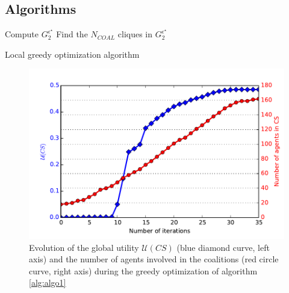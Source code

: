 \documentclass[journal]{IEEEtran}
\begin{document}
\pagestyle{plain}







\appendix
  
\subsection{Algorithms}


\begin{algorithm}
 Compute $ G_{2}^{\epsilon^{\star}} $ \;
 Find the $ N_{COAL} $ cliques in $ G_{2}^{\epsilon^{\star}} $\;
 \caption{Local greedy optimization algorithm}
 \label{alg:algo1}
\end{algorithm}

\begin{figure}[b]
\includegraphics[scale=.5]{./figs/figure_7}
\caption{Evolution of the global utility $ \mathcal{U}(CS) $ (blue diamond curve, left axis) and the number of agents involved in the coalitions (red circle curve, right axis) during the greedy optimization of algorithm \ref{alg:algo1} }
\label{fig:search}
\end{figure}
\end{document}
